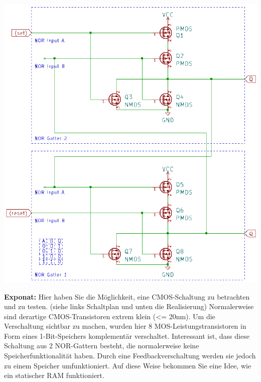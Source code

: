 \documentclass[a4paper]{article}
\begin{document}
	\noindent %
	\begin{minipage}[b]{0.45\textwidth}
		\centering
		\includegraphics[scale=0.45]{Figures/RS_Latch_Schematic}
	\end{minipage}\hfill %
	\begin{minipage}[b]{0.5\textwidth}
		\centering
		\begin{minipage}[t]{\textwidth}
			\centering
			\textbf{Exponat:} Hier haben Sie die Möglichkeit, eine CMOS-Schaltung zu betrachten und zu testen. (siehe links Schaltplan und unten die Realisierung)
			Normalerweise sind derartige CMOS-Transistoren extrem klein (<= 20nm). Um die Verschaltung sichtbar zu machen, wurden hier 8 MOS-Leistungstransistoren in Form eines 1-Bit-Speichers komplementär verschaltet. Interessant ist, dass diese Schaltung aus 2 NOR-Gattern besteht, die normalerweise keine Speicherfunktionalität haben. Durch eine Feedbackverschaltung werden sie jedoch zu einem Speicher umfunktioniert. Auf diese Weise bekommen Sie eine Idee, wie ein statischer RAM funktioniert. 
		\end{minipage}
		\vspace{0.4cm}
		
		\begin{minipage}[b]{\textwidth}
			\centering
		\end{minipage}
	\end{minipage}
\end{document}
